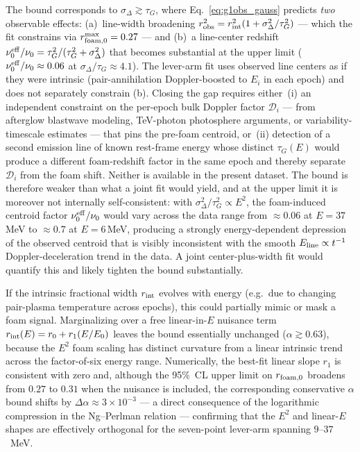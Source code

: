 \documentclass[aps,prd,onecolumn,amsmath,amssymb]{revtex4-2}
\begin{document}
The bound corresponds to $\sigma_\Delta\gtrsim\tau_G$,
where Eq.~\eqref{eq:g1obs_gauss} predicts \emph{two} observable
effects: (a)~line-width broadening
$r_{\rm obs}^2 = r_{\rm int}^2(1+\sigma_\Delta^2/\tau_G^2)$ --- which the
fit constrains via $r_{\rm foam,0}^{\rm max}=0.27$ --- and
(b)~a line-center redshift $\nu_0^{\rm eff}/\nu_0 =
\tau_G^2/(\tau_G^2+\sigma_\Delta^2)$ that becomes substantial at the
upper limit ($\nu_0^{\rm eff}/\nu_0\approx 0.06$ at
$\sigma_\Delta/\tau_G\approx 4.1$).  The lever-arm fit uses observed line
centers as if they were intrinsic (pair-annihilation Doppler-boosted to
$E_i$ in each epoch) and does not separately constrain (b).  Closing
the gap requires either~(i) an independent constraint on the per-epoch
bulk Doppler factor $\mathcal{D}_i$ --- from afterglow blastwave
modeling, TeV-photon photosphere arguments, or variability-timescale
estimates --- that pins the pre-foam centroid, or~(ii) detection of a
second emission line of known rest-frame energy whose distinct
$\tau_G(E)$ would produce a different foam-redshift factor in the same
epoch and thereby separate $\mathcal{D}_i$ from the foam shift.
Neither is available in the present dataset.  The bound is therefore
weaker than what a joint fit would yield, and at the upper limit it is
moreover not internally self-consistent: with $\sigma_\Delta^2/\tau_G^2
\propto E^2$, the foam-induced centroid factor $\nu_0^{\rm eff}/\nu_0$
would vary across the data range from $\approx 0.06$ at
$E=37$\,MeV to $\approx 0.7$ at $E=6$\,MeV, producing a strongly
energy-dependent depression of the observed centroid that is visibly
inconsistent with the smooth $E_{\rm line}\propto t^{-1}$
Doppler-deceleration trend in the data.  A joint center-plus-width fit
would quantify this and likely tighten the bound substantially.

If the intrinsic fractional width $r_{\rm int}$ evolves with
energy (e.g.\ due to changing pair-plasma temperature across epochs),
this could partially mimic or mask a foam signal.  Marginalizing over a
free linear-in-$E$ nuisance term $r_{\rm int}(E) = r_0 + r_1(E/E_0)$
leaves the bound essentially unchanged
($\alpha\gtrsim 0.63$), because the $E^2$ foam scaling has
distinct curvature from a linear intrinsic trend across the
factor-of-six energy range.  Numerically, the best-fit linear slope
$r_1$ is consistent with zero and, although the 95\%~CL upper limit
on $r_{\rm foam,0}$ broadens from $0.27$ to $0.31$ when the nuisance
is included, the corresponding conservative $\alpha$ bound shifts by
$\Delta\alpha\approx 3\times 10^{-3}$ --- a direct consequence of the
logarithmic compression in the Ng--Perlman
relation --- confirming that the $E^2$ and linear-$E$ shapes are
effectively orthogonal for the seven-point lever-arm spanning
$9$--$37$~MeV.
\end{document}
